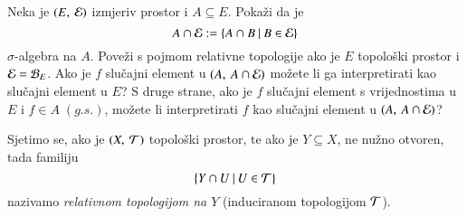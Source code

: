 \begin{zad} \label{zad:3.15}
    Neka je $(E, \: \mathcal{E})$ izmjeriv prostor i $A \subseteq E$.
    Poka\v zi da je
    \begin{equation*}
        A \cap \mathcal{E} := \{{A \cap B} \: | \: {B \in \mathcal{E}}\}
    \end{equation*}
    $\sigma$-algebra na $A$.
    Pove\v zi s pojmom relativne topologije ako je $E$ topolo\v ski prostor i $\mathcal{E} = \mathcal{B}_{E}$.
    Ako je $f$ slu\v cajni element u $(A, \: A \cap \mathcal{E})$ mo\v zete li ga interpretirati kao slu\v cajni element u $E$?
    S druge strane, ako je $f$ slu\v cajni element s vrijednostima u $E$ i $f \in A \; (g.s.)$, mo\v zete li interpretirati $f$ kao slu\v cajni element u $({A}, \: {A \cap \mathcal{E}})$?
\end{zad}

\begin{nap} \label{nap:3.15-1}
    Sjetimo se, ako je $({X}, \: {\mathcal{T}})$ topolo\v ski prostor, te ako je $Y \subseteq X$, ne nu\v zno otvoren, tada familiju
    \begin{equation*}
        \{{Y \cap U} \: | \: {U \in \mathcal{T}}\}
    \end{equation*}
    nazivamo \emph{relativnom topologijom na $Y$} (induciranom topologijom $\mathcal{T}$).
\end{nap}

